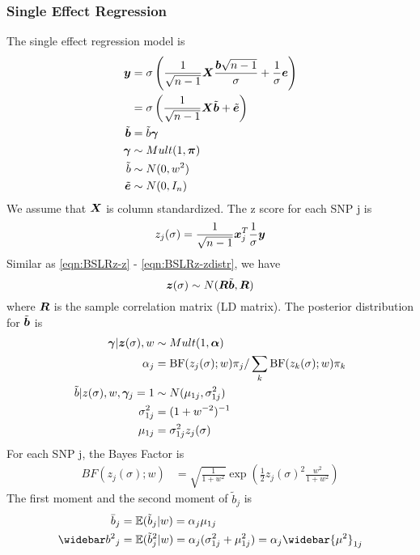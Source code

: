 \subsubsection{Single Effect Regression}
The single effect regression model is
\begin{align}
\bm y &= \sigma\left( \frac{1}{\sqrt{n-1}} \bm X \frac{\bm b\sqrt{n-1}}{\sigma} + \frac {1}{\sigma} \bm e \right) \\
 &= \sigma\left( \frac{1}{\sqrt{n-1}} \bm X \tilde{\bm b} + \tilde{\bm e} \right) \label{eqn:SERz-y}\\
\tilde{\bm b} &= \tilde{b} \bm \gamma \\
\bm \gamma &\sim Mult(1, \bm \pi) \\
\tilde{b} &\sim N(0, w^2) \\
\tilde{\bm e} & \sim N(0,I_n) \label{eqn:SERz-e}
\end{align}
We assume that $\bm X$ is column standardized. The z score for each SNP j is
\begin{equation}\label{eqn:zj}
    z_j(\sigma) = \frac{1}{\sqrt{n-1}}\bm x_j^T \frac{1}{\sigma}\bm y
\end{equation}
Similar as \eqref{eqn:BSLRz-z} - \eqref{eqn:BSLRz-zdistr}, we have
\begin{equation} \label{eqn:serz}
    \bm{z}(\sigma) \sim N(\bm R \tilde{\bm b}, \bm R)
\end{equation}
where $\bm R$ is the sample correlation matrix (LD matrix). The posterior distribution for $\tilde{\bm b}$ is
\begin{align} \label{eqn:serz-postgamma}
    \bm \gamma | \bm{z}(\sigma), w &\sim Mult(1, \bm \alpha) \\
    \alpha_j &= \text{BF}(z_j(\sigma); w) \pi_j/\sum_k \text{BF}(z_k(\sigma); w) \pi_k \label{eqn:serz-postalpha}\\
    \tilde{b} | z(\sigma), w, \bm \gamma_j = 1 &\sim N(\mu_{1j}, \sigma^2_{1j}) \label{eqn:serz-postb}\\
    \sigma^2_{1j} &= (1 + w^{-2})^{-1} \label{eqn:serz-postsigma}\\
    \mu_{1j} &= \sigma^2_{1j} z_j(\sigma) \label{eqn:serz-postmu}
\end{align}
For each SNP j, the Bayes Factor is
\begin{align} \label{eqn:SERzBFj}
    BF(z_j(\sigma); w) &= \sqrt{\frac{1}{1+w^2}} \exp\left( \frac{1}{2} z_j(\sigma)^2 \frac{w^2}{1+w^2} \right)
\end{align}
The first moment and the second moment of $\tilde{b}_j$ is 
\begin{align}
    \bb_j &= \mathbb{E}(\tilde{b}_j|w) = \alpha_j \mu_{1j} \label{eqn:serz 1st}\\
    \bbb_j &= \mathbb{E}(\tilde{b}_j^2|w) = \alpha_j (\rv_{1j} + \mu_{1j}^2) = \alpha_j \widebar{\mu^2}_{1j} \label{eqn:serz 2nd}
\end{align}
